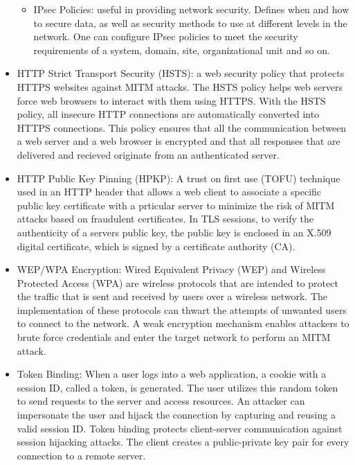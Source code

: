 \begin{itemize}
\begin{itemize}
        \item IPsec Policies: useful in providing network security. Defines when and how to secure data, as well as security methods to use at different levels in the network. One can configure IPsec policies to meet the security requirements of a system, domain, site, organizational unit and so on.
    \end{itemize}
    \item HTTP Strict Transport Security (HSTS): a web security policy that protects HTTPS websites against MITM attacks. The HSTS policy helps web servers force web browsers to interact with them using HTTPS. With the HSTS policy, all insecure HTTP connections are automatically converted into HTTPS connections. This policy ensures that all the communication between a web server and a web browser is encrypted and that all responses that are delivered and recieved originate from an authenticated server.
    \item HTTP Public Key Pinning (HPKP): A trust on first use (TOFU) technique used in an HTTP header that allows a web client to associate a specific public key certificate with a prticular server to minimize the risk of MITM attacks based on fraudulent certificates. In TLS sessions, to verify the authenticity of a servers public key, the public key is enclosed in an X.509 digital certificate, which is signed by a certificate authority (CA).
    \item WEP/WPA Encryption: Wired Equivalent Privacy (WEP) and Wireless Protected Access (WPA) are wireless protocols that are intended to protect the traffic that is sent and received by users over a wireless network. The implementation of these protocols can thwart the attempts of unwanted users to connect to the network. A weak encryption mechanism enables attackers to brute force credentials and enter the target network to perform an MITM attack.
    \item Token Binding: When a user logs into a web application, a cookie with a session ID, called a token, is generated. The user utilizes this random token to send requests to the server and access resources. An attacker can impersonate the user and hijack the connection by capturing and reusing a valid session ID. Token binding protects client-server communication against session hijacking attacks. The client creates a public-private key pair for every connection to a remote server.
    
\end{itemize}


